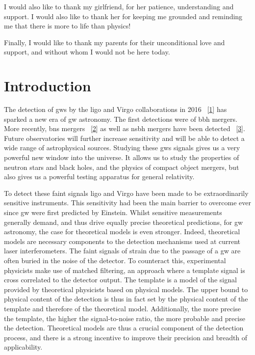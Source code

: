 \documentclass[
  10pt,
  a4paper,
  DIV=11,
  numbers=noendperiod,
  twoside]{scrreprt}
\DeclareRobustCommand{\[}{\begin{equation}}
\DeclareRobustCommand{\]}{\end{equation}}
\begin{document}
I would also like to thank my girlfriend, for her patience,
understanding and support. I would also like to thank her for keeping me
grounded and reminding me that there is more to life than physics!

Finally, I would like to thank my parents for their unconditional love
and support, and without whom I would not be here today.


\hypertarget{sec-intro}{%
\chapter{Introduction}\label{sec-intro}}

The detection of \glspl{gw} by the \gls{ligo} and Virgo collaborations
in 2016 ~{[}\protect\hyperlink{ref-LIGOScientific:2016aoc}{1}{]} has
sparked a new era of \gls{gw} astronomy. The first detections were of
\gls{bbh} mergers. More recently, \gls{bns} mergers
~{[}\protect\hyperlink{ref-LIGOScientific:2017vwq}{2}{]} as well as
\gls{nsbh} mergers have been detected
~{[}\protect\hyperlink{ref-LIGOScientific:2021qlt}{3}{]}. Future
observatories will further increase sensitivity and will be able to
detect a wide range of astrophysical sources. Studying these \glspl{gw}
signals gives us a very powerful new window into the universe. It allows
us to study the properties of neutron stars and black holes, and the
physics of compact object mergers, but also gives us a powerful testing
apparatus for general relativity.

To detect these faint signals \gls{ligo} and Virgo have been made to be
extraordinarily sensitive instruments. This sensitivity had been the
main barrier to overcome ever since \gls{gw} were first predicted by
Einstein. Whilst sensitive measurements generally demand, and thus drive
equally precise theoretical predictions, for \gls{gw} astronomy, the
case for theoretical models is even stronger. Indeed, theoretical models
are necessary components to the detection mechanisms used at current
laser interferometers. The faint signals of strain due to the passage of
a \gls{gw} are often buried in the noise of the detector. To counteract
this, experimental physicists make use of matched filtering, an approach
where a template signal is cross correlated to the detector output. The
template is a model of the signal provided by theoretical physicists
based on physical models. The upper bound to physical content of the
detection is thus in fact set by the physical content of the template
and therefore of the theoretical model. Additionally, the more precise
the template, the higher the signal-to-noise ratio, the more probable
and precise the detection. Theoretical models are thus a crucial
component of the detection process, and there is a strong incentive to
improve their precision and breadth of applicability.
\end{document}
